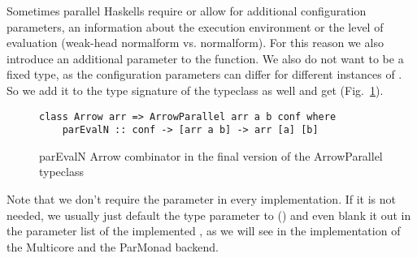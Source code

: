 Sometimes parallel Haskells require or allow for additional configuration parameters, \eg an information about the execution environment or the level of evaluation (weak-head normalform vs. normalform). For this reason we also introduce an additional  parameter to the function. We also do not want  to be a fixed type, as the configuration parameters can differ for different instances of . So we add it to the type signature of the typeclass as well and get  (Fig.~\ref{fig:parEvalNArrowTypeClassFinal}).
\begin{figure}[h]
\begin{lstlisting}[frame=htrbl]
class Arrow arr => ArrowParallel arr a b conf where
	parEvalN :: conf -> [arr a b] -> arr [a] [b]
\end{lstlisting}
\caption{parEvalN Arrow combinator in the final version of the ArrowParallel typeclass}
\label{fig:parEvalNArrowTypeClassFinal}
\end{figure}
Note that we don't require the  parameter in every implementation. If it is not needed, we usually just default the  type parameter to () and even blank it out in the parameter list of the implemented , as we will see in the implementation of the Multicore and the ParMonad backend.


